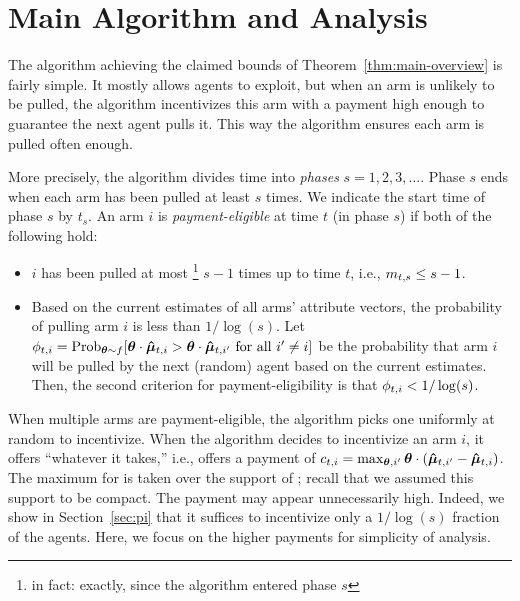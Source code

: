 \section{Main Algorithm and Analysis}
\label{sec:ub}

The algorithm achieving the claimed bounds of
Theorem~\ref{thm:main-overview} is fairly simple.
It mostly allows agents to exploit, but when an arm is   unlikely to be pulled,
the algorithm incentivizes this arm with a payment high enough
to guarantee the next agent pulls it.
This way the algorithm ensures each arm is pulled often enough.

More precisely, the algorithm divides time into \emph{phases}
$s = 1, 2, 3, \ldots$.
Phase $s$  ends when each arm has been pulled at least $s$ times.
We indicate the start time of phase $s$ by $t_s$.
An arm $i$ is \emph{payment-eligible} at time $t$ (in phase $s$)
if both of the following hold:
\pfdelete{
We call time $t_{s}=\min_{t}\{\forall i, \NumPull{t}{i} \geq s\}$ the
\emph{starting point of the $s^{th}$ phase}.
We call the set of times $[t_{s}, t_{s+1})$ the
\emph{$n^{th}$ phase}.
}

\begin{itemize}
\item $i$ has been pulled at most%
\footnote{in fact: exactly, since the algorithm entered phase $s$}
$s-1$ times up to time $t$, i.e., $m_{t,s} \leq s-1$.
\item Based on the current estimates  of all arms'
attribute vectors, the probability of pulling arm $i$ is less than $1/\log(s)$. 
Let $\PullProb{t}{i} = \Prob[\AgV \sim \AgentDist]{\AgV \cdot \ArmEV{t}{i} > \AgV
  \cdot \ArmEV{t}{i'} \mbox{ for all } i' \neq i}$
be the probability that arm $i$ will be pulled
by the next (random) agent based on the current estimates. 
Then, the second criterion for payment-eligibility is that
$\phi_{t,i} < 1/\log(s)$.
\end{itemize}

When multiple arms are payment-eligible, the algorithm picks one
uniformly at random to incentivize.
When the algorithm decides to incentivize an arm $i$,
it offers ``whatever it takes,'' i.e., offers a payment of
$c_{t,i} = \max_{\bm{\theta},i'} \bm{\theta} \cdot (\bm{\hat{\mu}}_{t,i'} - \bm{\hat{\mu}}_{t,i})$.
The maximum for \AgV is taken over the support of \AgentDist;
recall that we assumed this support to be compact.
The payment  may appear unnecessarily high.
Indeed, we show in Section~\ref{sec:pi} that it suffices to
incentivize only a $1/\log(s)$ fraction of the agents.
Here, we focus on the higher payments for simplicity of analysis.

